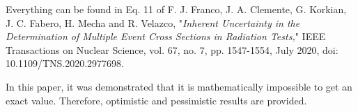 \begin{itemize}
	Everything can be found in Eq. 11 of F. J. Franco, J. A. Clemente, G. Korkian, 
	J. C. Fabero, H. Mecha and R. Velazco, "\textit{Inherent Uncertainty in the Determination of Multiple 
		Event Cross Sections in Radiation Tests,}" IEEE Transactions on Nuclear Science, vol. 67, no. 7, 
	pp. 1547-1554, July 2020, doi: 10.1109/TNS.2020.2977698.
	
	In this paper, it was demonstrated that it is mathematically impossible to get an exact value. Therefore,  optimistic and pessimistic results are provided.
\end{itemize}
